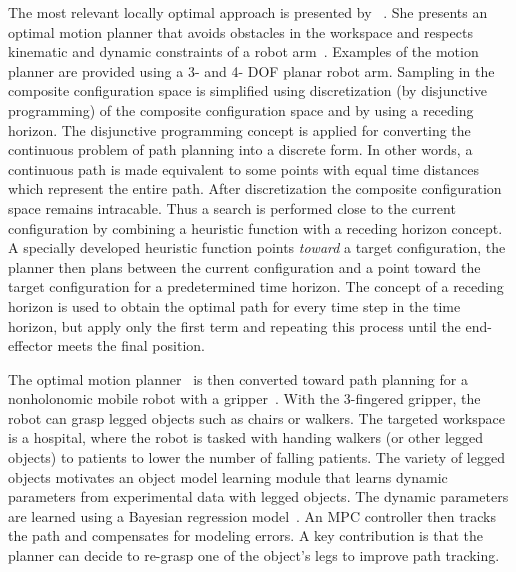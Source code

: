 The most relevant locally optimal approach is presented by \citeauthor{sabbaghnovin_model_2021}~\cite{sabbaghnovin_model_2021}. She presents an optimal motion planner that avoids obstacles in the workspace and respects kinematic and dynamic constraints of a robot arm~\cite{sabbaghnovin_optimal_2016}. Examples of the motion planner are provided using a 3- and 4- \ac{DOF} planar robot arm. Sampling in the composite configuration space is simplified using discretization (by disjunctive programming)  of the composite configuration space and by using a receding horizon. The disjunctive programming concept is applied for converting the continuous problem of path planning into a discrete form. In other words, a continuous path is made equivalent to some points with equal time distances which represent the entire path. After discretization the composite configuration space remains intracable. Thus a search is performed close to the current configuration by combining a heuristic function with a receding horizon concept. A specially developed heuristic function points \textit{toward} a target configuration, the planner then plans between the current configuration and a point toward the target configuration for a predetermined time horizon. The concept of a receding horizon is used to obtain the optimal path for every time step in the time horizon, but apply only the first term and repeating this process until the end-effector meets the final position.\bs

The optimal motion planner~\cite{sabbaghnovin_optimal_2016} is then converted toward path planning for a nonholonomic mobile robot with a gripper~\cite{novin_dynamic_2018}. With the 3-fingered gripper, the robot can grasp legged objects such as chairs or walkers. The targeted workspace is a hospital, where the robot is tasked with handing walkers (or other legged objects) to patients to lower the number of falling patients. The variety of legged objects motivates an object model learning module that learns dynamic parameters from experimental data with legged objects. The dynamic parameters are learned using a Bayesian regression model~\cite{scholz_navigation_2016}. An \ac{MPC} controller then tracks the path and compensates for modeling errors. A key contribution is that the planner can decide to re-grasp one of the object's legs to improve path tracking.\bs

